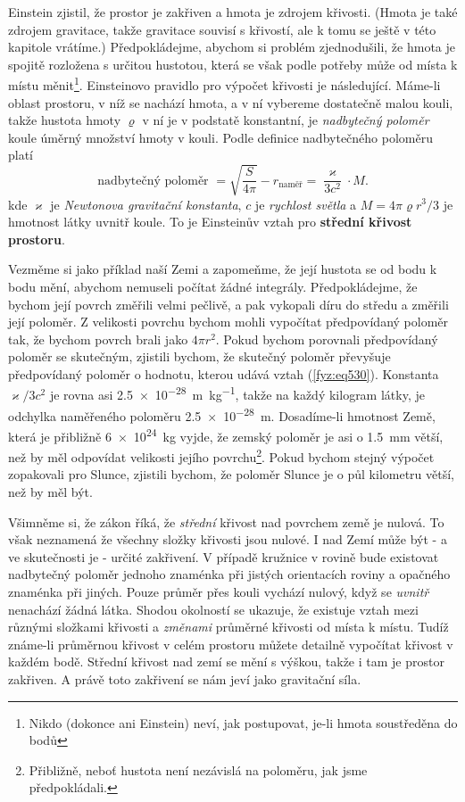     Einstein zjistil, že prostor je zakřiven a hmota je zdrojem křivosti. (Hmota je také zdrojem 
    gravitace, takže gravitace souvisí s křivostí, ale k tomu se ještě v této kapitole vrátíme.) 
    Předpokládejme, abychom si problém zjednodušili, že hmota je spojitě rozložena s určitou 
    hustotou, která se však podle potřeby může od místa k místu měnit\footnote{Nikdo (dokonce ani 
    Einstein) neví, jak postupovat, je-li hmota soustředěna do bodů}. Einsteinovo pravidlo pro 
    výpočet křivosti je následující. Máme-li oblast prostoru, v níž se nachází hmota, a v ní 
    vybereme dostatečně malou kouli, takže hustota hmoty \(\varrho\) v ní je v podstatě konstantní, 
    je \emph{nadbytečný poloměr} koule úměrný množství hmoty v kouli. Podle definice nadbytečného 
    poloměru platí
    \begin{equation}\label{fyz:eq530}
      \text{nadbytečný poloměr } = \sqrt{\dfrac{S}{4\pi}} - r_\text{naměř} 
                                 = \dfrac{\varkappa}{3c^2}\cdot M.
    \end{equation}
    kde \(\varkappa\) je \emph{Newtonova gravitační konstanta}, \(c\) je \emph{rychlost světla} a 
    \(M=4\pi\varrho r^3/3\) je hmotnost látky uvnitř koule. To je Einsteinův vztah pro 
    \textbf{střední křivost prostoru}. 
    
    Vezměme si jako příklad naší Zemi a zapomeňme, že její hustota se od bodu k bodu mění, abychom 
    nemuseli počítat žádné integrály. Předpokládejme, že bychom její povrch změřili velmi pečlivě, 
    a pak vykopali díru do středu a změřili její poloměr. Z velikosti povrchu bychom mohli 
    vypočítat předpovídaný poloměr tak, že bychom povrch brali jako \(4\pi r^2\). Pokud bychom 
    porovnali předpovídaný poloměr se skutečným, zjistili bychom, že skutečný poloměr převyšuje 
    předpovídaný poloměr o hodnotu, kterou udává vztah (\ref{fyz:eq530}). Konstanta 
    \(\varkappa/3c^2\) 
    je rovna asi \SI{2.5e-28}{\m\per\kg}, takže na každý kilogram látky, je odchylka naměřeného 
    poloměru \SI{2.5e-28}{\m}. Dosadíme-li hmotnost Země, která je přibližně \SI{6e24}{\kg} vyjde, 
    že zemský poloměr je asi o \SI{1.5}{\mm} větší, než by měl odpovídat velikosti jejího 
    povrchu\footnote{Přibližně, neboť hustota není nezávislá na poloměru, jak jsme předpokládali.}. 
    Pokud bychom stejný výpočet zopakovali pro Slunce, zjistili bychom, že poloměr Slunce je o půl 
    kilometru větší, než by měl být. 
    
    Všimněme si, že zákon říká, že \emph{střední} křivost nad povrchem země je nulová. To však 
    neznamená že všechny složky křivosti jsou nulové. I nad Zemí může být - a ve skutečnosti je - 
    určité zakřivení. V případě kružnice v rovině bude existovat nadbytečný poloměr jednoho 
    znaménka při jistých orientacích roviny a opačného znaménka při jiných. Pouze průměr přes kouli 
    vychází nulový, když se \emph{uvnitř} nenachází žádná látka. Shodou okolností se ukazuje, že 
    existuje vztah mezi různými složkami křivosti a \emph{změnami} průměrné křivosti od místa k 
    místu. Tudíž známe-li průměrnou křivost v celém prostoru můžete detailně vypočítat křivost v 
    každém bodě. Střední křivost nad zemí se mění s výškou, takže i tam je prostor zakřiven. A 
    právě toto zakřivení se nám jeví jako gravitační síla. 
    
